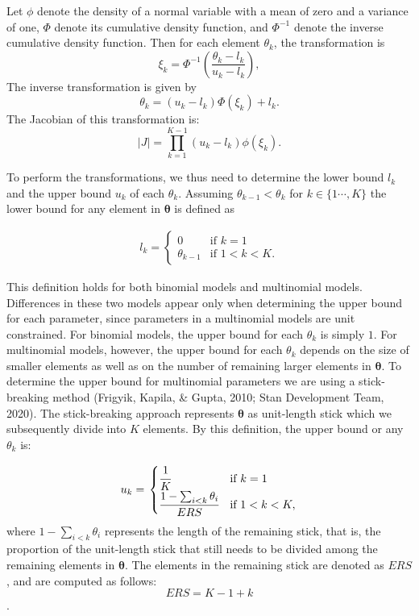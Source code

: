\documentclass[
  english,
  man,floatsintext]{apa6}
\begin{document}
Let \(\phi\) denote the density of a normal variable with a mean of zero and a variance of one, \(\Phi\) denote its cumulative density function, and \(\Phi^{-1}\) denote the inverse cumulative density function. Then for each element \(\theta_k\), the transformation is
\[\xi_k = \Phi^{-1}\left(\frac{\theta_k - l_k}{u_k - l_k}\right),\]
The inverse transformation is given by
\[\theta_k = (u_k - l_k) \Phi(\xi_k) + l_k.\]
The Jacobian of this transformation is:
\[\left|J\right| = \prod_{k = 1}^{K - 1}  \left(u_k - l_k \right) \phi(\xi_k).\]

To perform the transformations, we thus need to determine the lower bound \(l_k\) and the upper bound \(u_k\) of each \(\theta_k\). Assuming \(\theta_{k-1} < \theta_{k}\) for \(k \in \{1 \cdots, K\}\) the lower bound for any element in \(\boldsymbol{\theta}\) is defined as

\begin{align*}
  l_k = \left.
  \begin{cases}
      0 & \text{if } k = 1 \\
      \theta_{k - 1} & \text{if } 1 < k < K.
  \end{cases}
    \right.
\end{align*}

This definition holds for both binomial models and multinomial models. Differences in these two models appear only when determining the upper bound for each parameter, since parameters in a multinomial models are unit constrained. For binomial models, the upper bound for each \(\theta_k\) is simply \(1\). For multinomial models, however, the upper bound for each \(\theta_k\) depends on the size of smaller elements as well as on the number of remaining larger elements in \(\boldsymbol{\theta}\). To determine the upper bound for multinomial parameters we are using a stick-breaking method (Frigyik, Kapila, \& Gupta, 2010; Stan Development Team, 2020). The stick-breaking approach represents \(\boldsymbol{\theta}\) as unit-length stick which we subsequently divide into \(K\) elements. By this definition, the upper bound or any \(\theta_k\) is:

\begin{align}
\label{Eq:upperBound}
  u_k = \left.
  \begin{cases}
      \cfrac{1}{K} & \text{if } k = 1 \\
      \cfrac{1 - \sum_{i < k} \theta_i}{ERS} & \text{if } 1 < k < K,
  \end{cases}
    \right.
\end{align}
where \(1 - \sum_{i < k} \theta_i\) represents the length of the remaining stick, that is, the proportion of the unit-length stick that still needs to be divided among the remaining elements in \(\boldsymbol{\theta}\). The elements in the remaining stick are denoted as \(ERS\), and are computed as follows: \[ERS = K - 1 + k\].
\end{document}
